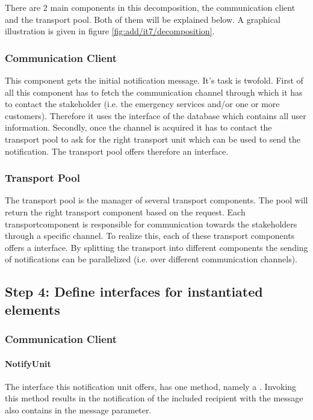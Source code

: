 \npar There are 2 main components in this decomposition, the communication
client and the transport pool. Both of them will be explained below. A graphical
illustration is given in figure \ref{fig:add/it7/decomposition}.

\subsubsection{Communication Client} 
\npar This component gets the initial notification message. It's task is
twofold. First of all this component has to fetch the communication channel
through which it has to contact the stakeholder (i.e. the emergency services
and/or one or more customers). Therefore it uses the 
interface of the database which contains all user information. Secondly, once
the channel is acquired it has to contact the transport pool to ask for the
right transport unit which can be used to send the notification. The transport
pool offers therefore an  interface.

\subsubsection{Transport Pool}

\npar The transport pool is the manager of several transport components. The
pool will return the right transport component based on the request. Each
transportcomponent is responsible for communication towards the stakeholders
through a specific channel. To realize this, each of these transport components
offers a  interface. By splitting the transport into different
components the sending of notifications can be parallelized (i.e. over
different communication channels).

\subsection{Step 4: Define interfaces for instantiated elements}
\label{add:it7/interfaces}

\subsubsection{Communication Client}

\paragraph{NotifyUnit}
\npar The interface this notification unit offers, has one method, namely a
. Invoking this method results in the notification of the
included recipient with the message also contains in the message parameter.

